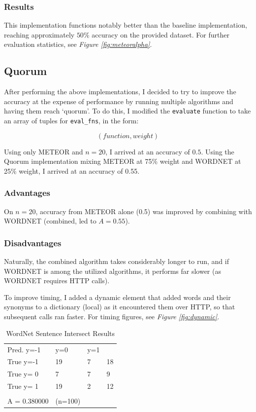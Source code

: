 \documentclass{article}
\begin{document}
\subsubsection{Results}
This implementation functions notably better than the baseline implementation, reaching approximately $50\%$ accuracy on the provided dataset. For further evaluation statistics, see \textit{Figure \ref{fig:meteoralpha}}.

\subsection{Quorum}
After performing the above implementations, I decided to try to improve the accuracy at the expense of performance by running multiple algorithms and having them reach `quorum'. To do this, I modified the \texttt{evaluate} function to take an array of tuples for \texttt{eval\_fns}, in the form:

$$(function, weight)$$

Using only METEOR and $n=20$, I arrived at an accuracy of $0.5$. Using the Quorum implementation mixing METEOR at 75\% weight and WORDNET at 25\% weight, I arrived at an accuracy of 0.55.

\subsubsection{Advantages}
On $n=20$, accuracy from METEOR alone (0.5) was improved by combining with WORDNET (combined, led to $A=0.55$).

\subsubsection{Disadvantages}
Naturally, the combined algorithm takes considerably longer to run, and if WORDNET is among the utilized algorithms, it performs far slower (as WORDNET requires HTTP calls).

To improve timing, I added a dynamic element that added words and their synonyms to a dictionary (local) as it encountered them over HTTP, so that subsequent calls ran faster. For timing figures, see \textit{Figure \ref{fig:dynamic}}.





\begin{table}[tbp]
\centering
\caption{WordNet Sentence Intersect Results}
\label{t1}
\begin{tabular}{llll}
Pred. y=-1          & y=0 & y=1 &    \\
True y=-1           & 19  & 7   & 18 \\
True y= 0           & 7   & 7   & 9  \\
True y= 1           & 19  & 2   & 12 \\
                    &     &     &    \\
A = 0.380000 &  (n=100)     &     &
\end{tabular}
\end{table}
\end{document}

